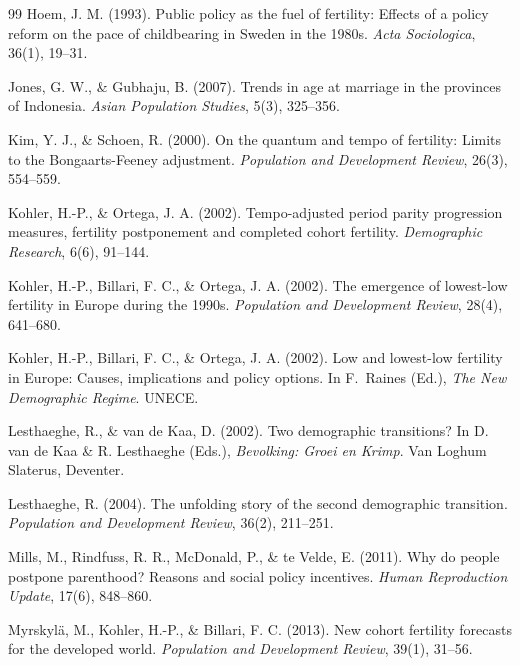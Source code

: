 \documentclass[12pt]{article}
\begin{document}
\begin{thebibliography}{99}
Hoem, J. M. (1993). Public policy as the fuel of fertility: Effects of a
policy reform on the pace of childbearing in Sweden in the 1980s.
\textit{Acta Sociologica}, 36(1), 19--31.

Jones, G. W., \& Gubhaju, B. (2007). Trends in age at marriage in the
provinces of Indonesia. \textit{Asian Population Studies}, 5(3), 325--356.

Kim, Y. J., \& Schoen, R. (2000). On the quantum and tempo of fertility:
Limits to the Bongaarts-Feeney adjustment. \textit{Population and Development
Review}, 26(3), 554--559.

Kohler, H.-P., \& Ortega, J. A. (2002). Tempo-adjusted period parity
progression measures, fertility postponement and completed cohort fertility.
\textit{Demographic Research}, 6(6), 91--144.

Kohler, H.-P., Billari, F. C., \& Ortega, J. A. (2002). The emergence of
lowest-low fertility in Europe during the 1990s. \textit{Population and
Development Review}, 28(4), 641--680.

Kohler, H.-P., Billari, F. C., \& Ortega, J. A. (2002). Low and lowest-low
fertility in Europe: Causes, implications and policy options. In F.\ Raines
(Ed.), \textit{The New Demographic Regime}. UNECE.

Lesthaeghe, R., \& van de Kaa, D. (2002). Two demographic transitions? In
D. van de Kaa \& R. Lesthaeghe (Eds.), \textit{Bevolking: Groei en Krimp}.
Van Loghum Slaterus, Deventer.

Lesthaeghe, R. (2004). The unfolding story of the second demographic
transition. \textit{Population and Development Review}, 36(2), 211--251.

Mills, M., Rindfuss, R. R., McDonald, P., \& te Velde, E. (2011). Why do
people postpone parenthood? Reasons and social policy incentives.
\textit{Human Reproduction Update}, 17(6), 848--860.

Myrskyl{\"a}, M., Kohler, H.-P., \& Billari, F. C. (2013). New cohort
fertility forecasts for the developed world. \textit{Population and
Development Review}, 39(1), 31--56.


\end{thebibliography}
\end{document}
